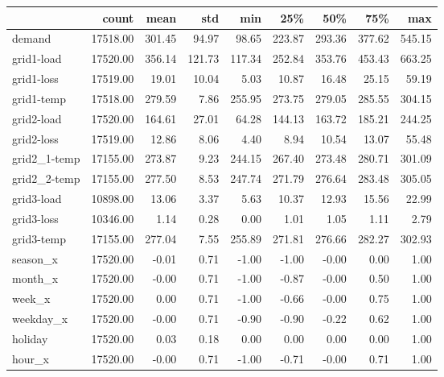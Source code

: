 \begin{tabular}{lrrrrrrrr}
\toprule
{} &    count &   mean &    std &    min &    25\% &    50\% &    75\% &    max \\
\midrule
demand       & 17518.00 & 301.45 &  94.97 &  98.65 & 223.87 & 293.36 & 377.62 & 545.15 \\
grid1-load   & 17520.00 & 356.14 & 121.73 & 117.34 & 252.84 & 353.76 & 453.43 & 663.25 \\
grid1-loss   & 17519.00 &  19.01 &  10.04 &   5.03 &  10.87 &  16.48 &  25.15 &  59.19 \\
grid1-temp   & 17518.00 & 279.59 &   7.86 & 255.95 & 273.75 & 279.05 & 285.55 & 304.15 \\
grid2-load   & 17520.00 & 164.61 &  27.01 &  64.28 & 144.13 & 163.72 & 185.21 & 244.25 \\
grid2-loss   & 17519.00 &  12.86 &   8.06 &   4.40 &   8.94 &  10.54 &  13.07 &  55.48 \\
grid2\_1-temp & 17155.00 & 273.87 &   9.23 & 244.15 & 267.40 & 273.48 & 280.71 & 301.09 \\
grid2\_2-temp & 17155.00 & 277.50 &   8.53 & 247.74 & 271.79 & 276.64 & 283.48 & 305.05 \\
grid3-load   & 10898.00 &  13.06 &   3.37 &   5.63 &  10.37 &  12.93 &  15.56 &  22.99 \\
grid3-loss   & 10346.00 &   1.14 &   0.28 &   0.00 &   1.01 &   1.05 &   1.11 &   2.79 \\
grid3-temp   & 17155.00 & 277.04 &   7.55 & 255.89 & 271.81 & 276.66 & 282.27 & 302.93 \\
season\_x     & 17520.00 &  -0.01 &   0.71 &  -1.00 &  -1.00 &  -0.00 &   0.00 &   1.00 \\
month\_x      & 17520.00 &  -0.00 &   0.71 &  -1.00 &  -0.87 &  -0.00 &   0.50 &   1.00 \\
week\_x       & 17520.00 &   0.00 &   0.71 &  -1.00 &  -0.66 &  -0.00 &   0.75 &   1.00 \\
weekday\_x    & 17520.00 &  -0.00 &   0.71 &  -0.90 &  -0.90 &  -0.22 &   0.62 &   1.00 \\
holiday      & 17520.00 &   0.03 &   0.18 &   0.00 &   0.00 &   0.00 &   0.00 &   1.00 \\
hour\_x       & 17520.00 &  -0.00 &   0.71 &  -1.00 &  -0.71 &  -0.00 &   0.71 &   1.00 \\
\bottomrule
\end{tabular}

